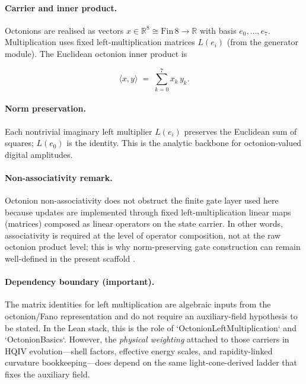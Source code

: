 \documentclass[11pt,a4paper]{article}
\theoremstyle{remark}
\begin{document}
\paragraph{Carrier and inner product.}
Octonions are realised as vectors $x\in\mathbb{R}^8\cong\mathrm{Fin}\,8\to\mathbb{R}$ with basis $e_0,\ldots,e_7$. Multiplication uses fixed left-multiplication matrices $L(e_i)$ (from the generator module). The Euclidean octonion inner product is

\begin{equation}
  \langle x,y\rangle \;=\; \sum_{k=0}^{7} x_k\,y_k.
\end{equation}

\paragraph{Norm preservation.}
Each nontrivial imaginary left multiplier $L(e_i)$ preserves the Euclidean sum of squares; $L(e_0)$ is the identity. This is the analytic backbone for octonion-valued digital amplitudes.

\paragraph{Non-associativity remark.}
Octonion non-associativity does not obstruct the finite gate layer used here because updates are implemented through fixed left-multiplication linear maps (matrices) composed as linear operators on the state carrier. In other words, associativity is required at the level of operator composition, not at the raw octonion product level; this is why norm-preserving gate construction can remain well-defined in the present scaffold \cite{baez2002octonions,freedman2019}.

\paragraph{Dependency boundary (important).}
The matrix identities for left multiplication are algebraic inputs from the octonion/Fano representation and do not require an auxiliary-field hypothesis to be stated. In the Lean stack, this is the role of `OctonionLeftMultiplication` and `OctonionBasics`. However, the \emph{physical weighting} attached to those carriers in HQIV evolution---shell factors, effective energy scales, and rapidity-linked curvature bookkeeping---does depend on the same light-cone-derived ladder that fixes the auxiliary field.

\end{document}
